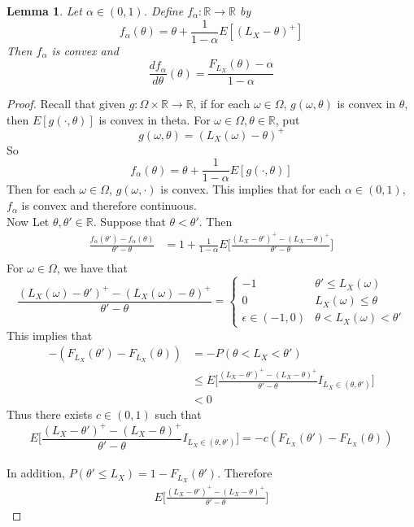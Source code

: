 \documentclass[12pt]{amsart}
\newtheorem{lem}[thm]{Lemma}
\newcommand{\al}{\alpha}
\newcommand{\ep}{\epsilon}
\newcommand{\om}{\omega}
\newcommand{\Om}{\Omega}
\newcommand{\R}{\mathbb{R}}
\begin{document}
\begin{lem}
Let $\al \in (0,1)$. Define $f_{\al}: \R \rightarrow \R$ by $$f_\al(\theta) = \theta + \frac{1}{1-\al}E[(L_X - \theta)^+]$$
Then $f_\al$ is convex and $$\frac{df_\al}{d \theta}(\theta) = \frac{F_{L_X}(\theta) - \al}{1-\al}$$
\end{lem}

\begin{proof} 
Recall that given $g:\Om \times \R \rightarrow \R$, if for each $\om \in \Om$, $g(\om, \theta)$ is convex in $\theta$, then $E[g(\cdot, \theta)]$ is convex in theta. For $\om \in \Om, \theta \in \R$, put $$g(\om, \theta) = (L_X(\om) - \theta)^+$$ So $$f_{\al}(\theta) = \theta + \frac{1}{1-\al}E[g(\cdot, \theta)]$$ Then for each $\om \in \Om$, $g(\om, \cdot)$ is convex. This implies that for each $\al\in (0,1)$, $f_{\al}$ is convex and therefore continuous. \vspace{3mm}\\ 
Now Let $\theta, \theta' \in \R$. Suppose that $\theta<\theta'$. Then 
\begin{align*}
\frac{f_\al(\theta') - f_\al(\theta)}{\theta' - \theta} 
&= 1 + \frac{1}{1-\al}E\bigg[\frac{(L_X - \theta')^+ - (L_X - \theta)^+}{\theta'-\theta}\bigg] \\
\end{align*}
For $\om \in \Om$, we have that 
$$\frac{(L_X(\om) - \theta')^+ - (L_X(\om) - \theta)^+}{\theta'-\theta}= 
\begin{cases}
-1 &  \theta' \leq L_X(\om) \\
0 & L_X(\om) \leq  \theta \\
\ep \in (-1,0) &\theta < L_X(\om) < \theta'
\end{cases}$$
This implies that 
\begin{align*}
-(F_{L_X}(\theta') - F_{L_X}(\theta))
&= -P(\theta < L_X < \theta') \\
&\leq E\bigg[ \frac{(L_X - \theta')^+ - (L_X - \theta)^+}{\theta'-\theta} I_{L_X \in (\theta, \theta')}\bigg] \\
&< 0
\end{align*} 
Thus there exists $c \in (0, 1)$ such that $$E\bigg[ \frac{(L_X - \theta')^+ - (L_X - \theta)^+}{\theta'-\theta} I_{L_X \in (\theta, \theta')}\bigg] = -c(F_{L_X}(\theta') - F_{L_X}(\theta))$$\vspace{3mm}\\
In addition, $P(\theta' \leq L_X) = 1-F_{L_X}(\theta')$.
Therefore 
\begin{align*}
E\bigg[ \frac{(L_X - \theta')^+ - (L_X - \theta)^+}{\theta'-\theta} \bigg]

\end{align*}
\end{proof}
\end{document}
